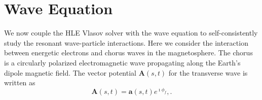 \section{Wave Equation}
\label{sec:wave}
We now couple the HLE Vlasov solver with the wave equation to self-consistently study the resonant wave-particle interactions. 
%
%
Here we consider the interaction between energetic electrons and  chorus waves in the magnetosphere.
The  chorus is a circularly polarized electromagnetic wave
propagating along the Earth's dipole magnetic field. 
The vector potential $\mathbf{A}(s,t)$ for the transverse wave is written as
\begin{equation}
    \mathbf{A}(s,t) = \mathbf{a}(s,t)e^{\imath \phi_f},.
\end{equation}
